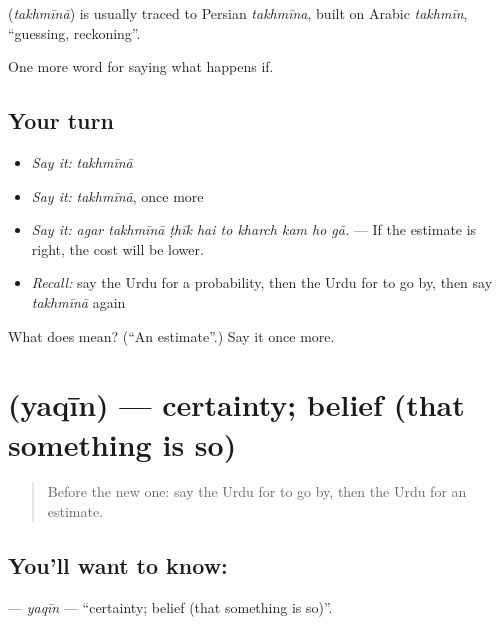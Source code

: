 \begin{cousinweb}
\textbf{} (\emph{takhmīnā}) is usually traced to Persian \emph{takhmīna}, built on Arabic \emph{takhmīn}, \textquotedblleft{}guessing, reckoning\textquotedblright{}.
\end{cousinweb}

\begin{grammarlens}[title={What you've built}]
One more word for saying what happens if.
\end{grammarlens}

\subsection*{Your turn}
\begin{itemize}
\raggedright
  \item \emph{Say it:} \emph{takhmīnā}
  \item \emph{Say it:} \emph{takhmīnā}, once more
  \item \emph{Say it:} \emph{agar takhmīnā ṭhīk hai to kharch kam ho gā.} — If the estimate is right, the cost will be lower.
  \item \emph{Recall:} say the Urdu for a probability, then the Urdu for to go by, then say \emph{takhmīnā} again
\end{itemize}

\begin{tcolorbox}[breakable,colback=teal!4,colframe=teal!35!black,title={Before you move on}]
What does  mean? (\textquotedblleft{}An estimate\textquotedblright{}.) Say it once more.
\end{tcolorbox}
\section[\texorpdfstring{\ur{یقین} (yaqīn)}{یقین (yaqīn)}]{ (yaqīn) — certainty; belief (that something is so)}

\label{lesson:UR-C362-yaqin}



\begin{quote}
Before the new one: say the Urdu for to go by, then the Urdu for an estimate.
\end{quote}

\subsection*{You'll want to know: }
\textbf{} — \emph{yaqīn} — \textquotedblleft{}certainty; belief (that something is so)\textquotedblright{}.

